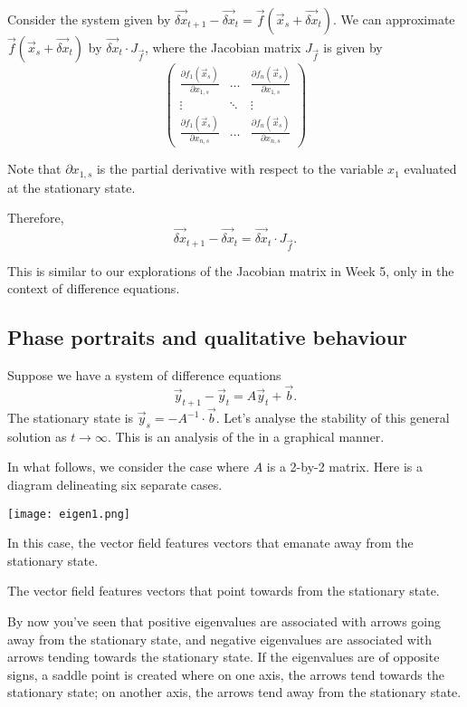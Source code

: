 \documentclass[a4paper, 12pt,oneside,openany]{book}
\begin{document}
Consider the system given by $\vec{\delta x}_{t+1}-\vec{\delta x}_t = \vec{f}(\vec{x}_s + \vec{\delta x}_t)$. We can approximate $ \vec{f}(\vec{x}_s + \vec{\delta x}_t)$ by $\vec{\delta x}_t \cdot J_{\vec{f}}$, where the Jacobian matrix $J_{\vec{f}}$ is given by $$ \begin{pmatrix} \frac{\partial f_1(\vec{x}_s)}{\partial x_{1, s}} & \dots & \frac{\partial f_n(\vec{x}_s)}{\partial x_{1, s}}\\ \vdots & \ddots & \vdots \\ \frac{\partial f_1(\vec{x}_s)}{\partial x_{n, s}} & \dots & \frac{\partial f_n(\vec{x}_s)}{\partial x_{n, s}}\end{pmatrix}$$

Note that $\partial x_{1, s}$ is the partial derivative with respect to the variable $x_1$ evaluated at the stationary state.

Therefore, $$\vec{\delta x}_{t+1}-\vec{\delta x}_t = \vec{\delta x}_t \cdot J_{\vec{f}}.$$ 

This is similar to our explorations of the Jacobian matrix in Week 5, only in the context of difference equations. 

\subsection{Phase portraits and qualitative behaviour}

Suppose we have a system of difference equations $$\vec{y}_{t+1}-\vec{y}_t = A\vec{y}_t + \vec{b}.$$ The stationary state is $\vec{y}_s = -A^{-1} \cdot \vec{b}$. Let's analyse the stability of this general solution as $t\to\infty$. This is an analysis of the  in a graphical manner.


In what follows, we consider the case where $A$ is a 2-by-2 matrix. Here is a diagram delineating six separate cases.

\texttt{[image: eigen1.png]}

 In this case, the vector field features vectors that emanate away from the stationary state.

 The vector field features vectors that point towards from the stationary state.

 By now you've seen that positive eigenvalues are associated with arrows going away from the stationary state, and negative eigenvalues are associated with arrows tending towards the stationary state. If the eigenvalues are of opposite signs, a saddle point is created where on one axis, the arrows tend towards the stationary state; on another axis, the arrows tend away from the stationary state.
\end{document}
